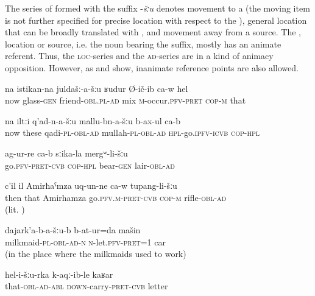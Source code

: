The series of  formed with the suffix -\textit{šːu} denotes movement to a  (the moving item is not further specified for precise location with respect to the ), general location that can be broadly translated with , and movement away from a source. The , location or source, i.e. the noun bearing the  suffix, mostly has an animate referent. Thus, the \textsc{loc}-series and the \textsc{ad}-series are in a kind of animacy opposition. However, as  and  show, inanimate reference points are also allowed.
%
\begin{exe}
	\ex	\label{ex:He mingled with his drinking friends}
	\gll	na	istikan-na	juldašː-a-šːu	ʁudur	Ø-ič-ib ca-w	hel\\
		now	glass-\textsc{gen}	friend-\textsc{obl}.\textsc{pl}-\textsc{ad}	mix	\textsc{m}-occur.\textsc{pfv}-\textsc{pret} \textsc{cop-m}	that\\
	\glt	{}
	
	\ex	\label{ex:They go to the qadis, to the mullahs}
	\gll	na	iltːi	q'ad-n-a-šːu	mallu-bn-a-šːu	b-ax-ul ca-b \\
		now	these	qadi-\textsc{pl}-\textsc{obl}-\textsc{ad}	mullah-\textsc{pl}-\textsc{obl}-\textsc{ad}	\textsc{hpl}-go.\textsc{ipfv}-\textsc{icvb} \textsc{cop-hpl}\\
	\glt	{}
	
	\ex	\label{ex:They went to the cave of the bear}
	\gll	ag-ur-re ca-b	sːika-la	mergʷ-li-šːu \\
		go.\textsc{pfv}-\textsc{pret}-\textsc{cvb} \textsc{cop-hpl}	bear-\textsc{gen}	lair-\textsc{obl}-\textsc{ad}\\
	\glt	{}
	
	\ex	\label{ex:Then Amirhamza took a rifle}
	\gll	c'il	il	Amirħaˁmza	uq-un-ne ca-w	tupang-li-šːu\\
		then	that	Amirhamza	go.\textsc{pfv.m}-\textsc{pret}-\textsc{cvb} \textsc{cop-m} rifle-\textsc{obl}-\textsc{ad}\\
	\glt	{} (lit. )
	
	\ex	\label{ex:(We) left the car with the milkmaids}
	\gll	dajark'a-b-a-šːu-b	b-at-ur=da	mašin\\
		milkmaid-\textsc{pl}-\textsc{obl}-\textsc{ad}-\textsc{n}	\textsc{n}-let.\textsc{pfv}-\textsc{pret}=1	car\\
	\glt	{} (in the place where the milkmaids used to work)
	
	\ex	\label{ex:From him (they) brought a permission}
	\gll	hel-i-šːu-rka	k-aqː-ib-le	kaʁar\\
		that-\textsc{obl}-\textsc{ad}-\textsc{abl}	\textsc{down}-carry-\textsc{pret}-\textsc{cvb}	letter\\
	\glt	{}
\end{exe}


